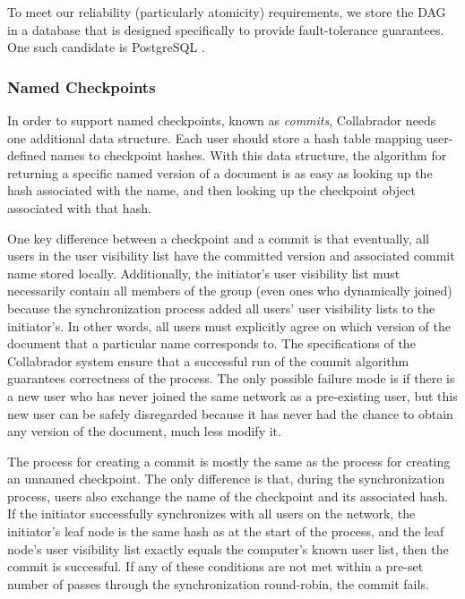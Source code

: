 \documentclass[11pt,titlepage]{article}
\begin{document}
To meet our reliability (particularly atomicity) requirements, we
store the DAG in a database that is designed specifically to provide
fault-tolerance guarantees.  One such candidate is PostgreSQL
\cite{postgres}.

\subsubsection{Named Checkpoints}

In order to support named checkpoints, known as \emph{commits},
Collabrador needs one additional data structure. Each user should
store a hash table mapping user-defined names to checkpoint hashes. 
With this data structure, the algorithm for returning a specific named
version of a document is as easy as looking up the hash associated with the name,
and then looking up the checkpoint object associated with that hash.

One key difference between a checkpoint and a commit is that eventually, 
all users in the user visibility list have the
committed version and associated commit name stored
locally. Additionally, the initiator's user visibility list must
necessarily contain all members of the group (even ones who
dynamically joined) because the synchronization process added all
users' user visibility lists to the initiator's. In other words,
all users must explicitly agree on which version of the document that
a particular name corresponds to. 
The specifications of the Collabrador system ensure that a successful
run of the commit algorithm guarantees correctness of the
process. The only possible failure mode is if there is a new user
 who has never joined the same network as a pre-existing user, 
but this new user can be safely disregarded because it has never 
had the chance to obtain any version of the document, much less modify it.

The process for creating a commit is mostly the same as the process
for creating an unnamed checkpoint. The only difference is that,
during the synchronization process, users also exchange the name of
the checkpoint and its associated hash. If the initiator successfully
synchronizes with all users on the network, the initiator's leaf node
is the same hash as at the start of the process, and the leaf node's
user visibility list exactly equals the computer's known user list,
then the commit is successful. If any of these conditions are not met
within a pre-set number of passes through the synchronization
round-robin, the commit fails.
\end{document}
